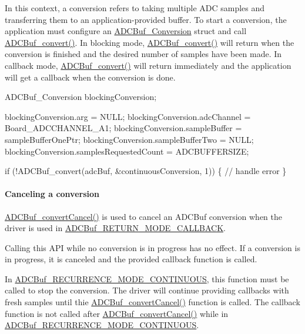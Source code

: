 In this context, a conversion refers to taking multiple A\+D\+C samples and transferring them to an application-\/provided buffer. To start a conversion, the application must configure an \hyperlink{struct_a_d_c_buf___conversion}{A\+D\+C\+Buf\+\_\+\+Conversion} struct and call \hyperlink{_a_d_c_buf_8h_a762253a94875258c5a71b591f03f9d97}{A\+D\+C\+Buf\+\_\+convert()}. In blocking mode, \hyperlink{_a_d_c_buf_8h_a762253a94875258c5a71b591f03f9d97}{A\+D\+C\+Buf\+\_\+convert()} will return when the conversion is finished and the desired number of samples have been made. In callback mode, \hyperlink{_a_d_c_buf_8h_a762253a94875258c5a71b591f03f9d97}{A\+D\+C\+Buf\+\_\+convert()} will return immediately and the application will get a callback when the conversion is done.


\begin{DoxyCode}
ADCBuf_Conversion blockingConversion;

blockingConversion.arg = NULL;
blockingConversion.adcChannel = Board\_ADCCHANNEL\_A1;
blockingConversion.sampleBuffer = sampleBufferOnePtr;
blockingConversion.sampleBufferTwo = NULL;
blockingConversion.samplesRequestedCount = ADCBUFFERSIZE;

\textcolor{keywordflow}{if} (!ADCBuf_convert(adcBuf, &continuousConversion, 1)) \{
    \textcolor{comment}{// handle error}
\}
\end{DoxyCode}


\paragraph*{Canceling a conversion}

\hyperlink{_a_d_c_buf_8h_a5201c27bddf11b9f9ae902807bded40d}{A\+D\+C\+Buf\+\_\+convert\+Cancel()} is used to cancel an A\+D\+C\+Buf conversion when the driver is used in \hyperlink{_a_d_c_buf_8h_a3d643e8024503c5ef2679c83419ba6eea633b4b063b88d7c62e9e2513075a36a7}{A\+D\+C\+Buf\+\_\+\+R\+E\+T\+U\+R\+N\+\_\+\+M\+O\+D\+E\+\_\+\+C\+A\+L\+L\+B\+A\+C\+K}.

Calling this A\+P\+I while no conversion is in progress has no effect. If a conversion is in progress, it is canceled and the provided callback function is called.

In \hyperlink{_a_d_c_buf_8h_af15cc4961b02af48216132c2b8bc88f1ac10945188f88ddadd4322c4e117d5b3c}{A\+D\+C\+Buf\+\_\+\+R\+E\+C\+U\+R\+R\+E\+N\+C\+E\+\_\+\+M\+O\+D\+E\+\_\+\+C\+O\+N\+T\+I\+N\+U\+O\+U\+S}, this function must be called to stop the conversion. The driver will continue providing callbacks with fresh samples until thie \hyperlink{_a_d_c_buf_8h_a5201c27bddf11b9f9ae902807bded40d}{A\+D\+C\+Buf\+\_\+convert\+Cancel()} function is called. The callback function is not called after \hyperlink{_a_d_c_buf_8h_a5201c27bddf11b9f9ae902807bded40d}{A\+D\+C\+Buf\+\_\+convert\+Cancel()} while in \hyperlink{_a_d_c_buf_8h_af15cc4961b02af48216132c2b8bc88f1ac10945188f88ddadd4322c4e117d5b3c}{A\+D\+C\+Buf\+\_\+\+R\+E\+C\+U\+R\+R\+E\+N\+C\+E\+\_\+\+M\+O\+D\+E\+\_\+\+C\+O\+N\+T\+I\+N\+U\+O\+U\+S}.

